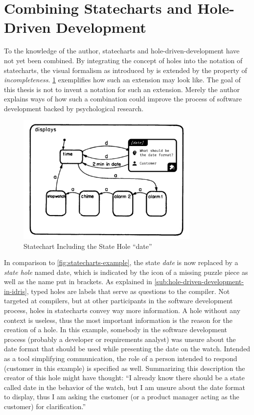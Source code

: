 \section{Combining Statecharts and Hole-Driven Development}
\label{sec:combining-statecharts-and-hole-driven-development}
To the knowledge of the author, statecharts and hole-driven-development have not yet been combined.
By integrating the concept of holes into the notation of statecharts, the visual formalism as introduced by \textcite{harel_statecharts:_1987} is extended by the property of \emph{incompleteness}.
\cref{fig:statecharts-hole-example} exemplifies how such an extension may look like.
The goal of this thesis is not to invent a notation for such an extension.
Merely the author explains ways of how such a combination could improve the process of software development backed by psychological research.
\begin{figure}[h]
\centering
\includegraphics[width=0.8\textwidth]{images/statechart-hole-example}
\caption{Statechart Including the State Hole ``date''}
\label{fig:statecharts-hole-example}
\end{figure}
In comparison to \cref{fig:statecharts-example}, the state \emph{date} is now replaced by a \emph{state hole} named date, which is indicated by the icon of a missing puzzle piece as well as the name put in brackets.
As explained in \cref{sub:hole-driven-development-in-idris}, typed holes are labels that serve as questions to the compiler.
Not targeted at compilers, but at other participants in the software development process, holes in statecharts convey way more information.
A hole without any context is useless, thus the most important information is the reason for the creation of a hole.
In this example, somebody in the software development process (probably a developer or requirements analyst) was unsure about the date format that should be used while presenting the date on the watch.
Intended as a tool simplifying communication, the role of a person intended to respond (customer in this example) is specified as well.
Summarizing this description the creator of this hole might have thought: ``I already know there should be a state called date in the behavior of the watch, but I am unsure about the date format to display, thus I am asking the customer (or a product manager acting as the customer) for clarification.''

